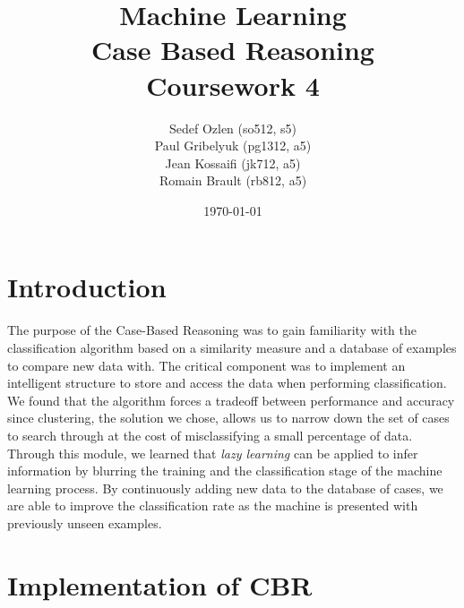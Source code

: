 \documentclass[a4paper,12pt,oneside,final]{report}
\author{
    Sedef Ozlen (so512, s5) \\ 
    Paul Gribelyuk (pg1312, a5) \\
    Jean Kossaifi (jk712, a5) \\ 
    Romain Brault (rb812, a5)
}
\title{\Huge Machine Learning \\ Case Based Reasoning \\ Coursework 4}
\date{\today}
\begin{document}
\maketitle
\tableofcontents

\chapter{Introduction}
The purpose of the Case-Based Reasoning was to gain familiarity with the classification algorithm based on a similarity measure and a database of examples to compare new data with.  The critical component was to implement an intelligent structure to store and access the data when performing classification.  We found that the algorithm forces a tradeoff between performance and accuracy since clustering, the solution we chose, allows us to narrow down the set of cases to search through at the cost of misclassifying a small percentage of data.  
Through this module, we learned that \emph{lazy learning} can be applied to infer information by blurring the training and the classification stage of the machine learning process.  By continuously adding new data to the database of cases, we are able to improve the classification rate as the machine is presented with previously unseen examples.

\chapter{Implementation of CBR}
\end{document}
